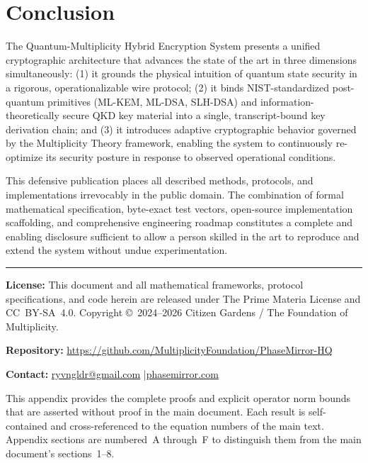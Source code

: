 \documentclass[12pt,letterpaper]{article}
\theoremstyle{plain}
\theoremstyle{definition}
\begin{document}
\section{Conclusion}

The Quantum-Multiplicity Hybrid Encryption System presents a unified
cryptographic architecture that advances the state of the art in three
dimensions simultaneously: (1) it grounds the physical intuition of quantum
state security in a rigorous, operationalizable wire protocol; (2) it binds
NIST-standardized post-quantum primitives (ML-KEM, ML-DSA, SLH-DSA) and
information-theoretically secure QKD key material into a single, transcript-bound
key derivation chain; and (3) it introduces adaptive cryptographic behavior
governed by the Multiplicity Theory framework, enabling the system to
continuously re-optimize its security posture in response to observed
operational conditions.

This defensive publication places all described methods, protocols, and
implementations irrevocably in the public domain. The combination of
formal mathematical specification, byte-exact test vectors, open-source
implementation scaffolding, and comprehensive engineering roadmap
constitutes a complete and enabling disclosure sufficient to allow a person
skilled in the art to reproduce and extend the system without undue
experimentation.


\vfill
\hrule
\vspace{0.5em}
\small
\noindent\textbf{License:} This document and all mathematical frameworks,
protocol specifications, and code herein are released under The Prime Materia License and CC~BY-SA~4.0.
Copyright \copyright\ 2024--2026 Citizen Gardens / The Foundation of Multiplicity.

\noindent\textbf{Repository:}
\url{https://github.com/MultiplicityFoundation/PhaseMirror-HQ}

\noindent\textbf{Contact:} \href{mailto:ryvngldr@gmail.com}{ryvngldr@gmail.com}
\quad|\quad \href{https://phasemirror.com}{phasemirror.com}

\appendix
This appendix provides the complete proofs and explicit operator norm bounds
that are asserted without proof in the main document.  Each result is
self-contained and cross-referenced to the equation numbers of the main text.
Appendix sections are numbered~A through~F to distinguish them from the main
document's sections~1--8.
\end{document}
